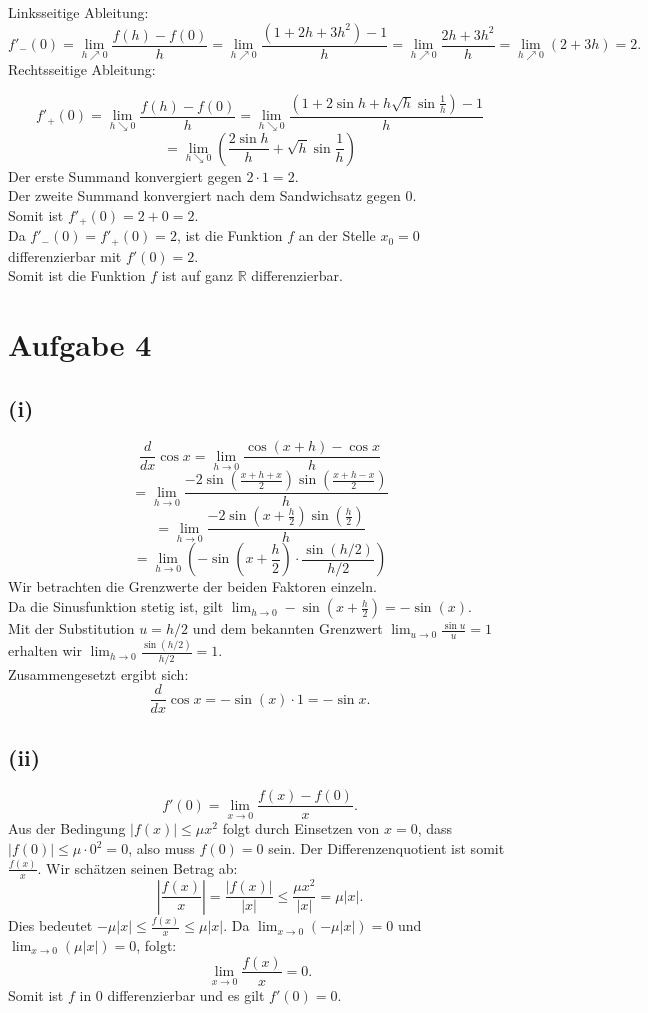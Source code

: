 \documentclass{article}
\begin{document}
Linksseitige Ableitung:
\[f'_-(0) = \lim_{h\nearrow0} \frac{f(h)-f(0)}{h} = \lim_{h\nearrow0} \frac{(1+2h+3h^2)-1}{h} = \lim_{h\nearrow0} \frac{2h+3h^2}{h} = \lim_{h\nearrow0} (2+3h) = 2.\]
Rechtsseitige Ableitung:

\[f'_+(0) = \lim_{h\searrow0} \frac{f(h)-f(0)}{h} = \lim_{h\searrow0} \frac{(1+2\sin h + h\sqrt{h}\sin\frac{1}{h})-1}{h} \]
\[= \lim_{h\searrow0} \left( \frac{2\sin h}{h} + \sqrt{h}\sin\frac{1}{h} \right)\]
Der erste Summand konvergiert gegen \(2 \cdot 1 = 2\). \\
Der zweite Summand konvergiert nach dem Sandwichsatz gegen 0. \\
Somit ist \(f'_+(0) = 2 + 0 = 2\). \\
Da \(f'_-(0) = f'_+(0) = 2\), ist die Funktion \(f\) an der Stelle \(x_0=0\) differenzierbar mit \(f'(0)=2\). \\
Somit ist die Funktion \(f\) ist auf ganz \(\mathbb{R}\) differenzierbar.

\section*{Aufgabe 4}
\subsection*{(i)}
\[\frac{d}{dx}\cos x = \lim_{h\to0} \frac{\cos(x+h) - \cos x}{h} \]
\[= \lim_{h\to0} \frac{-2\sin\left(\frac{x+h+x}{2}\right)\sin\left(\frac{x+h-x}{2}\right)}{h} \]
\[= \lim_{h\to0} \frac{-2\sin\left(x+\frac{h}{2}\right)\sin\left(\frac{h}{2}\right)}{h} \]
\[= \lim_{h\to0} \left(-\sin\left(x+\frac{h}{2}\right) \cdot \frac{\sin(h/2)}{h/2}\right) \]
Wir betrachten die Grenzwerte der beiden Faktoren einzeln. \\
Da die Sinusfunktion stetig ist, gilt \(\lim_{h\to0} -\sin(x+\frac{h}{2}) = -\sin(x)\). \\
Mit der Substitution \(u = h/2\) und dem bekannten Grenzwert \(\lim_{u\to0} \frac{\sin u}{u} = 1\) erhalten wir \(\lim_{h\to0} \frac{\sin(h/2)}{h/2} = 1\). \\
Zusammengesetzt ergibt sich:
\[\frac{d}{dx}\cos x = -\sin(x) \cdot 1 = -\sin x.\]

\subsection*{(ii)}
\[f'(0) = \lim_{x\to0} \frac{f(x)-f(0)}{x}.\]
Aus der Bedingung \(|f(x)| \le \mu x^2\) folgt durch Einsetzen von \(x=0\), dass \(|f(0)| \le \mu \cdot 0^2 = 0\), also muss \(f(0)=0\) sein.
Der Differenzenquotient ist somit \(\frac{f(x)}{x}\). Wir schätzen seinen Betrag ab:
\[\left|\frac{f(x)}{x}\right| = \frac{|f(x)|}{|x|} \le \frac{\mu x^2}{|x|} = \mu|x|.\]
Dies bedeutet \(-\mu|x| \le \frac{f(x)}{x} \le \mu|x|\). 
Da \(\lim_{x\to0} (-\mu|x|) = 0\) und \(\lim_{x\to0} (\mu|x|) = 0\), folgt:
\[\lim_{x\to0} \frac{f(x)}{x} = 0.\]
Somit ist \(f\) in 0 differenzierbar und es gilt \(f'(0)=0\).
\end{document}
